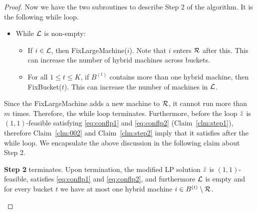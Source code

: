 \documentclass{article}[11pt]
\newcommand{\brt}{{(t)}}
\begin{document}
\begin{proof}
	
	Now we have the two subroutines to describe Step 2 of the algorithm. It is the following while loop.
	\begin{itemize}[noitemsep]
		\item[{}] While ${\cal L}$ is non-empty: 
		\begin{itemize}[noitemsep]
			\item If $i\in {\cal L}$, then {\sf FixLargeMachine}($i$). Note that $i$ enters ${\cal R}$ after this. This can increase the number of hybrid machines across buckets.
			\item For all $1\leq t\leq K$, if $B^\brt$ contains more than one hybrid machine, then {\sf FixBucket}($t$). This can increase the number of machines in ${\cal L}$.
		\end{itemize}
	\end{itemize}
	
	Since the {\sf FixLargeMachine} adds a new machine to ${\cal R}$, it cannot run more than $m$ times. Therefore, the while loop terminates. Furthermore, before the loop $\bar z$ is $(1,1)$-feasible satisfying \eqref{eq:conflp1} and \eqref{eq:conflp2} (Claim~\ref{clm:step1}), therefore Claim~\ref{clm:002} and Claim~\ref{clm:step2} imply that it satisfies after the while loop. We encapsulate the above discussion in the following claim about Step 2.
	\begin{claim}\label{clm:003}
		{\bf Step 2} terminates. Upon termination, the modified LP solution $\bar z$ is $(1,1)$-feasible, satisfies \eqref{eq:conflp1} and \eqref{eq:conflp2}, and furthermore
		${\cal L}$ is empty and for every bucket $t$ we have at most one hybrid machine $i\in B^\brt\setminus\calR$.
	\end{claim}
	\smallskip
	

\end{proof}
\end{document}
